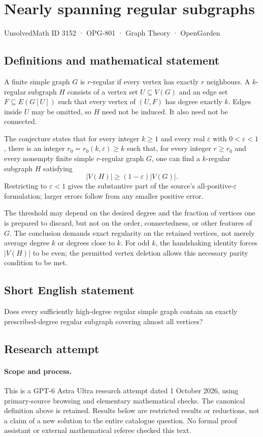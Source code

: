 \documentclass[11pt,a4paper]{article}
\begin{document}
\section*{Nearly spanning regular subgraphs}\label{3152}
{\small UnsolvedMath ID 3152 · OPG-801 · Graph Theory · OpenGarden}
\subsection{Definitions and mathematical statement}
A finite simple graph $G$ is $r$-regular if every vertex has exactly
$r$ neighbours. A $k$-regular subgraph $H$ consists of a vertex set
$U\subseteq V(G)$ and an edge set $F\subseteq E(G[U])$ such that
every vertex of $(U,F)$ has degree exactly $k$. Edges inside $U$
may be omitted, so $H$ need not be induced. It also need not be
connected.

The conjecture states that for every integer $k\geq1$ and every
real $\varepsilon$ with $0<\varepsilon<1$, there is an integer
$r_0=r_0(k,\varepsilon)\geq k$ such that, for every integer
$r\geq r_0$ and every nonempty finite simple $r$-regular graph $G$,
one can find a $k$-regular subgraph $H$ satisfying
\[
 |V(H)|\geq(1-\varepsilon)|V(G)|.
\]
Restricting to $\varepsilon<1$ gives the substantive part of the
source's all-positive-$\varepsilon$ formulation; larger errors
follow from any smaller positive error.

The threshold may depend on the desired degree and the fraction
of vertices one is prepared to discard, but not on the order,
connectedness, or other features of $G$. The conclusion demands
exact regularity on the retained vertices, not merely average
degree $k$ or degrees close to $k$. For odd $k$, the handshaking
identity forces $|V(H)|$ to be even; the permitted vertex deletion
allows this necessary parity condition to be met.
\subsection{Short English statement}
Does every sufficiently high-degree regular simple graph contain an exactly prescribed-degree regular subgraph covering almost all vertices?
\subsection{Research attempt}
\paragraph{Scope and process.}
This is a GPT-6 Astra Ultra research attempt dated 1 October 2026, using
primary-source browsing and elementary mathematical checks. The canonical
definition above is retained. Results below are restricted results or
reductions, not a claim of a new solution to the entire catalogue question.
No formal proof assistant or external mathematical referee checked this text.
\end{document}
